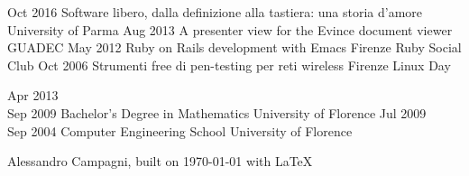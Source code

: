 \documentclass[9pt]{developercv} %
\begin{document}
\vspace{0.8cm}



\begin{entrylist}
    \entry
        {Oct 2016}
        {Software libero, dalla definizione alla tastiera: una storia d'amore}
        {University of Parma}
        {}
    \entry
        {Aug 2013}
        {A presenter view for the Evince document viewer}
        {GUADEC}
        {}
    \entry
        {May 2012}
        {Ruby on Rails development with Emacs}
        {Firenze Ruby Social Club}
        {}
    \entry
        {Oct 2006}
        {Strumenti free di pen-testing per reti wireless}
        {Firenze Linux Day}
        {}
\end{entrylist}

\vspace{0.8cm}



\begin{entrylist}
	\entry
		{Apr 2013\\Sep 2009}
		{Bachelor's Degree in Mathematics}
		{University of Florence}
		{}%
	\entry
		{Jul 2009\\Sep 2004}
		{Computer Engineering School}
		{University of Florence}
		{}%
\end{entrylist}

\vspace{0.8cm}


\vspace{3.0cm}
\hspace{10cm}\footnotesize{Alessandro Campagni, built on \today \hspace{0.02cm} with \LaTeX}
\end{document}
